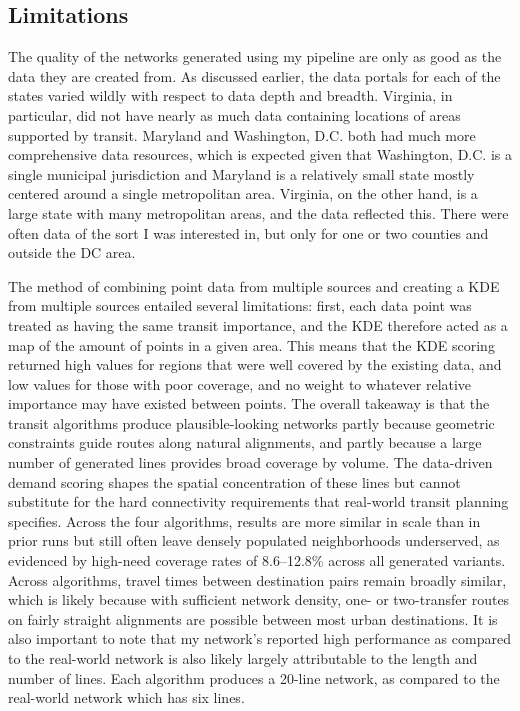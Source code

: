 \documentclass[sigconf,nonacm]{acmart}
\begin{document}
\subsection{Limitations}
The quality of the networks generated using my pipeline are only as good as the data they are created from. As discussed earlier, the data portals for each of the states varied wildly with respect to data depth and breadth. Virginia, in particular, did not have nearly as much data containing locations of areas supported by transit. Maryland and Washington, D.C. both had much more comprehensive data resources, which is expected given that Washington, D.C. is a single municipal jurisdiction and Maryland is a relatively small state mostly centered around a single metropolitan area. Virginia, on the other hand, is a large state with many metropolitan areas, and the data reflected this. There were often data of the sort I was interested in, but only for one or two counties and outside the DC area. 

The method of combining point data from multiple sources and creating a KDE from multiple sources entailed several limitations: first, each data point was treated as having the same transit importance, and the KDE therefore acted as a map of the amount of points in a given area. This means that the KDE scoring returned high values for regions that were well covered by the existing data, and low values for those with poor coverage, and no weight to whatever relative importance may have existed between points. The overall takeaway is that the transit algorithms produce plausible-looking networks partly because geometric constraints guide routes along natural alignments, and partly because a large number of generated lines provides broad coverage by volume. The data-driven demand scoring shapes the spatial concentration of these lines but cannot substitute for the hard connectivity requirements that real-world transit planning specifies. Across the four algorithms, results are more similar in scale than in prior runs but still often leave densely populated neighborhoods underserved, as evidenced by high-need coverage rates of 8.6--12.8\% across all generated variants. Across algorithms, travel times between destination pairs remain broadly similar, which is likely because with sufficient network density, one- or two-transfer routes on fairly straight alignments are possible between most urban destinations. It is also important to note that my network's reported high performance as compared to the real-world network is also likely largely attributable to the length and number of lines. Each algorithm produces a 20-line network, as compared to the real-world network which has six lines. 
\end{document}
